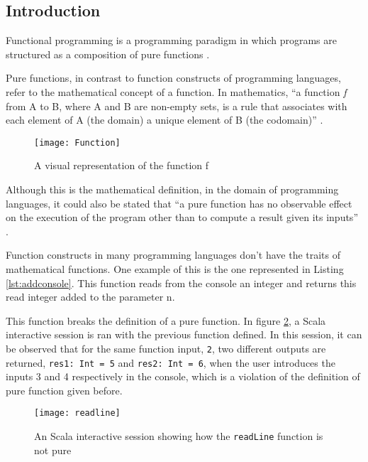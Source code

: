 \documentclass[../main.tex]{subfiles}
\begin{document}
\subsection{Introduction} Functional programming is a programming paradigm in
which programs are structured as a composition of pure functions
\autocite{Hughes1989WhyMatters}.

Pure functions, in contrast to function constructs of programming languages,
refer to the mathematical concept of a function. In mathematics, ``a function \textit{f}
from A to B, where A and B are non-empty sets, is a rule that associates with
each element of A (the domain) a unique element of B (the codomain)''
\autocite{NicholsonTheMathematics}.

\begin{figure}[ht]
  \centering \texttt{[image: Function]}
  \caption{\label{fig:label} A visual representation of the function f}
\end{figure}


Although this is the mathematical definition, in the domain of programming
languages, it could also be stated that ``a pure function has no observable effect
on the execution of the program other than to compute a result given its inputs''
\autocite{Chiusano2013FunctionalScala}.

Function constructs in many programming languages don't have the
traits of mathematical functions. One example of this is the one represented in
Listing \ref{lst:addconsole}. This function reads from the console an integer
and returns this read integer added to the parameter n.



This function breaks the definition of a pure function. In figure
\ref{fig:readLineN}, a Scala interactive session is ran with the previous
function defined. In this session, it can be observed that for the same function input,
\texttt{2}, two different outputs are returned, \texttt{res1: Int = 5} and \texttt{res2:
  Int = 6}, when the user introduces the inputs 3 and 4 respectively in the console, which is a violation of the definition of pure function given before.

\begin{figure}[ht]
  \centering \texttt{[image: readline]}
  \caption{\label{fig:readLineN} An Scala interactive session showing how the
    \texttt{readLine} function is not pure}
\end{figure}
\end{document}
